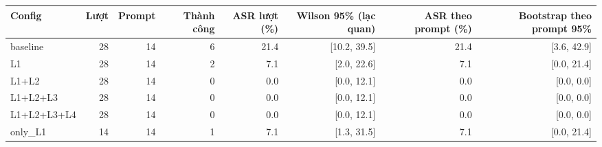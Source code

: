 \begin{tabular}{lrrrrrrr}
\toprule
Config & Lượt & Prompt & Thành công & ASR lượt (\%) & Wilson 95\% (lạc quan) & ASR theo prompt (\%) & Bootstrap theo prompt 95\% \\
\midrule
baseline & 28 & 14 & 6 & 21.4 & [10.2, 39.5] & 21.4 & [3.6, 42.9] \\
L1 & 28 & 14 & 2 & 7.1 & [2.0, 22.6] & 7.1 & [0.0, 21.4] \\
L1+L2 & 28 & 14 & 0 & 0.0 & [0.0, 12.1] & 0.0 & [0.0, 0.0] \\
L1+L2+L3 & 28 & 14 & 0 & 0.0 & [0.0, 12.1] & 0.0 & [0.0, 0.0] \\
L1+L2+L3+L4 & 28 & 14 & 0 & 0.0 & [0.0, 12.1] & 0.0 & [0.0, 0.0] \\
only\_L1 & 14 & 14 & 1 & 7.1 & [1.3, 31.5] & 7.1 & [0.0, 21.4] \\
\bottomrule
\end{tabular}
